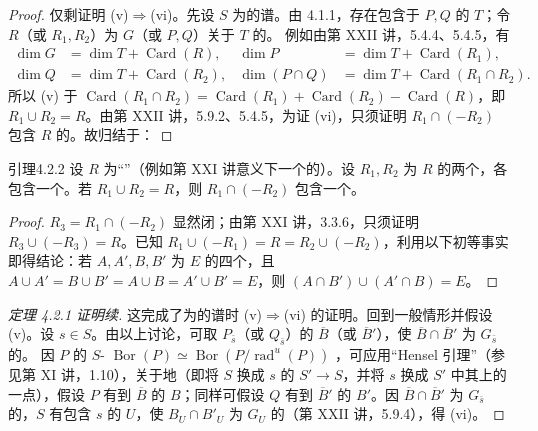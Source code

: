 \begin{proof}
仅剩证明 (v)$\Rightarrow$(vi)。先设 $S$ 为的谱。由 4.1.1，存在包含于 $P,Q$ 的 $T$；令 $R$（或 $R_1,R_2$）为 $G$（或 $P,Q$）关于 $T$ 的。
例如由第 XXII 讲，5.4.4、5.4.5，有
\[\begin{aligned}
\dim G&=\dim T+\operatorname{Card}(R),&\dim P&=\dim T+\operatorname{Card}(R_1),\\
\dim Q&=\dim T+\operatorname{Card}(R_2),&\dim(P\cap Q)&=\dim T+\operatorname{Card}(R_1\cap R_2).
\end{aligned}\]
所以 (v) 于 $\operatorname{Card}(R_1\cap R_2)=\operatorname{Card}(R_1)+\operatorname{Card}(R_2)-\operatorname{Card}(R)$，即 $R_1\cup R_2=R$。由第 XXII 讲，5.9.2、5.4.5，为证 (vi)，只须证明 $R_1\cap(-R_2)$ 包含 $R$ 的。故归结于：
\end{proof}
\begin{SGAresult}{引理}{4.2.2}
设 $R$ 为“”（例如第 XXI 讲意义下一个的）。设 $R_1,R_2$ 为 $R$ 的两个，各包含一个。若 $R_1\cup R_2=R$，则 $R_1\cap(-R_2)$ 包含一个。
\end{SGAresult}
\begin{proof}
$R_3=R_1\cap(-R_2)$ 显然闭；由第 XXI 讲，3.3.6，只须证明 $R_3\cup(-R_3)=R$。已知 $R_1\cup(-R_1)=R=R_2\cup(-R_2)$，利用以下初等事实即得结论：若 $A,A',B,B'$ 为 $E$ 的四个，且 $A\cup A'=B\cup B'=A\cup B=A'\cup B'=E$，则 $(A\cap B')\cup(A'\cap B)=E$。
\end{proof}
\begin{proof}[定理 4.2.1 证明续]
这完成了为的谱时 (v)$\Rightarrow$(vi) 的证明。回到一般情形并假设 (v)。设 $s\in S$。由以上讨论，可取 $P_{\bar s}$（或 $Q_{\bar s}$）的 $\overline B$（或 $\overline B'$），使 $\overline B\cap\overline B'$ 为 $G_{\bar s}$ 的。
因 $P$ 的 $S$- $\operatorname{Bor}(P)\simeq\operatorname{Bor}(P/\operatorname{rad}^{u}(P))$ ，可应用“Hensel 引理”（参见第 XI 讲，1.10），关于地（即将 $S$ 换成 $s$ 的 $S'\to S$，并将 $s$ 换成 $S'$ 中其上的一点），假设 $P$ 有到 $\overline B$ 的 $B$；同样可假设 $Q$ 有到 $\overline B'$ 的 $B'$。因 $\overline B\cap\overline B'$ 为 $G_{\bar s}$ 的，$S$ 有包含 $s$ 的 $U$，使 $B_U\cap B'_U$ 为 $G_U$ 的（第 XXII 讲，5.9.4），得 (vi)。
\end{proof}
